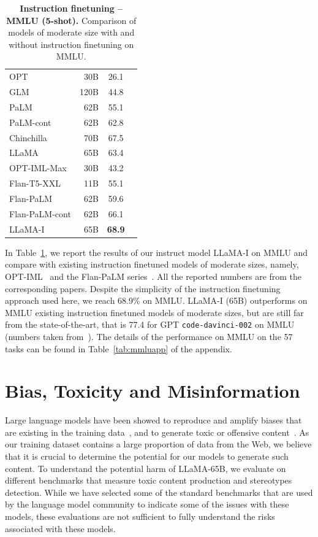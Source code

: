 \documentclass[11pt]{article}
\newcommand{\model}{LLaMA\xspace}%
\begin{document}
\begin{table}[h]
\centering
\begin{tabular}{lrc c}
\toprule
OPT  & 30B  & 26.1 \\
GLM  & 120B & 44.8 \\
PaLM & 62B  & 55.1 \\
PaLM-cont   & 62B & 62.8 \\
Chinchilla & 70B & 67.5 \\
\model & 65B & 63.4 \\
\midrule
OPT-IML-Max         & 30B & 43.2 \\
Flan-T5-XXL     & 11B & 55.1 \\
Flan-PaLM       & 62B & 59.6 \\
Flan-PaLM-cont & 62B & 66.1 \\
\model-I       & 65B & \bf 68.9 \\
\bottomrule
\end{tabular}
\caption{
\textbf{Instruction finetuning -- MMLU (5-shot).}
Comparison of models of moderate size with and without instruction finetuning on MMLU.
\label{tab:instruct}
}
\end{table}


In Table~\ref{tab:instruct}, we report the results of our instruct model \model-I on MMLU and compare with existing instruction finetuned models of moderate sizes, namely, OPT-IML~\cite{iyer2022opt} and the Flan-PaLM series~\cite{Chung2022ScalingIL}. 
All the reported numbers are from the corresponding papers.
Despite the simplicity of the instruction finetuning approach used here, we reach 68.9\% on MMLU.
\model-I (65B) outperforms on MMLU existing instruction finetuned models of moderate sizes, but are still far from the state-of-the-art, that is 77.4 for GPT \texttt{code-davinci-002} on MMLU (numbers taken from~\citet{iyer2022opt}).
The details of the performance on MMLU on the 57 tasks can be found in Table~\ref{tab:mmluapp} of the appendix.


\section{Bias, Toxicity and Misinformation}

Large language models have been showed to reproduce and amplify biases that are existing in the training data~\citep{sheng2019woman,kurita2019quantifying}, and to generate toxic or offensive content~\citep{gehman2020realtoxicityprompts}.
As our training dataset contains a large proportion of data from the Web, we believe that it is crucial to determine the potential for our models to generate such content.
To understand the potential harm of \model-65B, we evaluate on different benchmarks that measure toxic content production and stereotypes detection.
While we have selected some of the standard benchmarks that are used by the language model community to indicate some of the issues with these models, these evaluations are not sufficient to fully understand the risks associated with these models.
\end{document}
